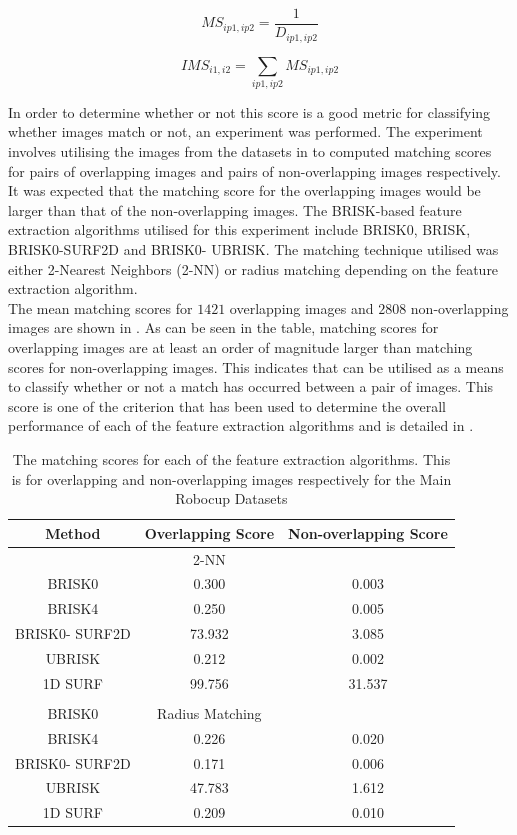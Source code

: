 \documentclass{report}
\begin{document}
\begin{equation}
MS_{ip1, ip2} = \frac{1}{D_{ip1, ip2}}
\label{eqn:inverseDistance}
\end{equation}

\begin{equation}
IMS_{i1, i2} = \sum_{ip1, ip2} MS_{ip1, ip2}
\label{eqn:ims}
\end{equation}

In order to determine whether or not this score is a good metric for classifying whether images match or not, an experiment was performed. The experiment involves utilising the images from the datasets in  to computed matching scores for pairs of overlapping images and pairs of non-overlapping images respectively. It was expected that the matching score for the overlapping images would be larger than that of the non-overlapping images. The BRISK-based feature extraction algorithms utilised for this experiment include BRISK0, BRISK, BRISK0-SURF2D and BRISK0- UBRISK. The matching technique utilised was either 2-Nearest Neighbors (2-NN) or radius matching depending on the feature extraction algorithm.\\

The mean matching scores for $1421$ overlapping images and $2808$ non-overlapping images are shown in . As can be seen in the table, matching scores for overlapping images are at least an order of magnitude larger than matching scores for non-overlapping images. This indicates that  can be utilised as a means to classify whether or not a match has occurred between a pair of images. This score is one of the criterion that has been used to determine the overall performance of each of the feature extraction algorithms and is detailed in .\\

\begin{table}
\caption{The matching scores for each of the feature extraction algorithms. This is for overlapping and non-overlapping images respectively for the Main Robocup Datasets}
\begin{tabular}{|c|c|c|}
\hline 
Method & Overlapping Score & Non-overlapping Score\tabularnewline
\hline 
\hline 
 & 2-NN & \tabularnewline
\hline 
BRISK0 & 0.300 & 0.003\tabularnewline
\hline 
BRISK4 & 0.250 & 0.005\tabularnewline
\hline 
BRISK0- SURF2D & 73.932 & 3.085\tabularnewline
\hline 
UBRISK & 0.212 & 0.002\tabularnewline
\hline 
1D SURF & 99.756 & 31.537\tabularnewline
\hline 
 &  & \tabularnewline
\hline 
BRISK0 & Radius Matching & \tabularnewline
\hline 
BRISK4 & 0.226 & 0.020\tabularnewline
\hline 
BRISK0- SURF2D & 0.171 & 0.006\tabularnewline
\hline 
UBRISK & 47.783 & 1.612\tabularnewline
\hline 
1D SURF & 0.209 & 0.010\tabularnewline
\hline 
\end{tabular}
\label{tab:matchingScoreCompare}
\end{table}
\end{document}
